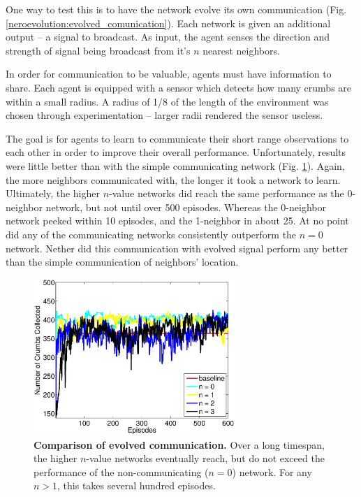\documentclass[conference]{IEEEtran}
\begin{document}
One way to test this is to have the network evolve its own communication (Fig. \ref{neroevolution:evolved_comunication}). Each network is given an additional output -- a signal to broadcast. As input, the agent senses the direction and strength of signal being broadcast from it's $n$ nearest neighbors. 

In order for communication to be valuable, agents must have information to share. 
Each agent is equipped with a sensor which detects how many crumbs are within a small radius. A radius of 1/8 of the length of the environment was chosen through experimentation -- larger radii rendered the sensor useless.



The goal is for agents to learn to communicate their short range observations to each other in order to improve their overall performance.
Unfortunately, results were little better than with the simple communicating network (Fig. \ref{neroevolution:evolved_comunication_results}). 
Again, the more neighbors communicated with, the longer it took a network to learn. Ultimately, the higher $n$-value networks did reach the same performance as the 0-neighbor network, but not until over 500 episodes. Whereas the 0-neighbor network peeked within 10 episodes, and the 1-neighbor in about 25. At no point did any of the communicating networks consistently outperform the $n=0$ network. Nether did this communication with evolved signal perform any better than the simple communication of neighbors' location. 

\begin{figure}[t]
\centering
\includegraphics[width=3.0in]{./figures/neroevolution/emerg.eps}
\caption{\textbf{Comparison of evolved communication.} Over a long timespan, the higher $n$-value networks eventually reach, but do not exceed the performance of the non-communicating ($n=0$) network. For any $n>1$, this takes several hundred episodes. }
\label{neroevolution:evolved_comunication_results}
\end{figure}
\end{document}
